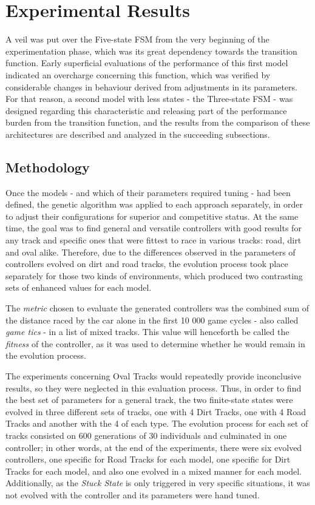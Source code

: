 \section{Experimental Results} \label{sec:Experiments}

	A veil was put over the Five-state FSM from the very beginning of the experimentation phase, which was its great dependency towards the transition function. Early superficial evaluations of the performance of this first model indicated an overcharge concerning this function, which was verified by considerable changes in behaviour derived from adjustments in its parameters. For that reason, a second model with less states - the Three-state FSM - was designed regarding this characteristic and releasing part of the performance burden from the transition function, and the results from the comparison of these architectures are described and analyzed in the succeeding subsections.

\subsection{Methodology} \label{subsec:Methodology}

	Once the models - and which of their parameters required tuning - had been defined, the genetic algorithm was applied to each approach separately, in order to adjust their configurations for superior and competitive status. At the same time, the goal was to find general and versatile controllers with good results for any track and specific ones that were fittest to race in various tracks: road, dirt and oval alike. Therefore, due to the differences observed in the parameters of controllers evolved on dirt and road tracks, the evolution process took place separately for those two kinds of environments, which produced two contrasting sets of enhanced values for each model.
	
	The \emph{metric} chosen to evaluate the generated controllers was the combined sum of the distance raced by the car alone in the first 10 000 game cycles - also called \emph{game tics} - in a list of mixed tracks. This value will henceforth be called the \emph{fitness} of the controller, as it was used to determine whether he would remain in the evolution process.
	
	The experiments concerning Oval Tracks would repeatedly provide inconclusive results, so they were neglected in this evaluation process. Thus, in order to find the best set of parameters for a general track, the two finite-state states were evolved in three different sets of tracks, one with 4 Dirt Tracks, one with 4 Road Tracks and another with the 4 of each type. The evolution process for each set of tracks consisted on 600 generations of 30 individuals and culminated in one controller; in other words, at the end of the experiments, there were six evolved controllers, one specific for Road Tracks for each model, one specific for Dirt Tracks for each model, and also one evolved in a mixed manner for each model. Additionally, as the \emph{Stuck State} is only triggered in very specific situations, it was not evolved with the controller and its parameters were hand tuned.
	
